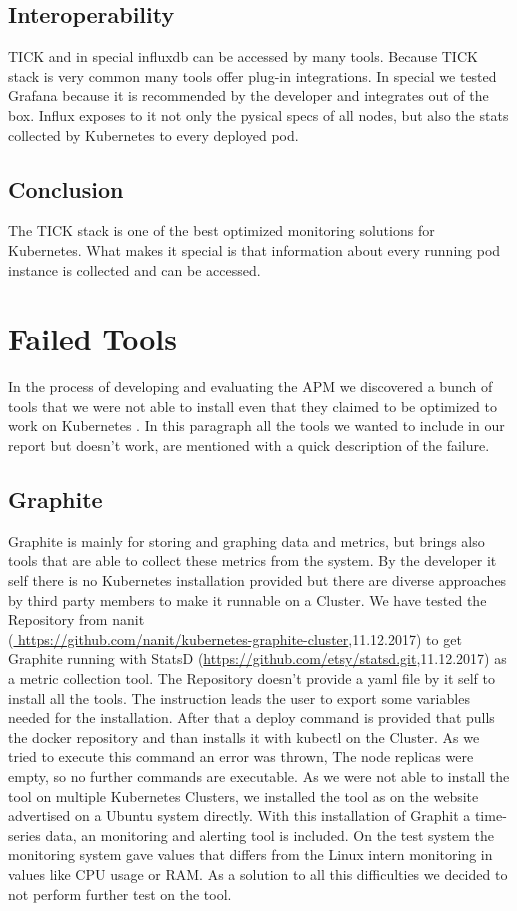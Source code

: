 \subsection{Interoperability}
TICK and in special influxdb can be accessed by many tools. Because TICK stack is very common many tools offer plug-in integrations. In special we tested Grafana because it is recommended by the developer and integrates out of the box. Influx exposes to it not only the pysical specs of all nodes, but also the stats collected by Kubernetes to every deployed pod. 
\subsection{Conclusion}
The TICK stack is one of the best optimized monitoring solutions for Kubernetes. What makes it special is that information about every running pod instance is collected and can be accessed.



\section{Failed Tools}%
In the process of developing and evaluating the APM we discovered a bunch of tools that we were not able to install even that they claimed to be optimized to work on Kubernetes .
In this paragraph all the tools we wanted to include in our report but doesn't work, are mentioned with a quick description of the failure.
\subsection{Graphite}
Graphite is mainly for storing and graphing data and metrics, but brings also tools that are able to collect these metrics from the system. By the developer it self there is no Kubernetes installation provided but there are diverse approaches by third party members to make it runnable on a Cluster. We have tested the Repository from nanit\\(\url{ https://github.com/nanit/kubernetes-graphite-cluster},11.12.2017) to get Graphite running with StatsD (\url{https://github.com/etsy/statsd.git},11.12.2017) as a metric collection tool. The Repository doesn't provide a yaml file by it self to install all the tools. The instruction leads the user to export some variables needed for the installation. After that a deploy command is provided that pulls the docker repository and than installs it with kubectl on the Cluster. As we tried to execute this command an error was thrown, The node replicas were empty, so no further commands are executable. As we were not able to install the tool on multiple Kubernetes Clusters, we installed the tool as on the website advertised on a Ubuntu system directly. With this installation of Graphit a time-series data, an monitoring and alerting tool is included. On the test system the monitoring system gave values that differs from the Linux intern monitoring in values like CPU usage or RAM. As a solution to all this difficulties we decided to not perform further test on the tool.

